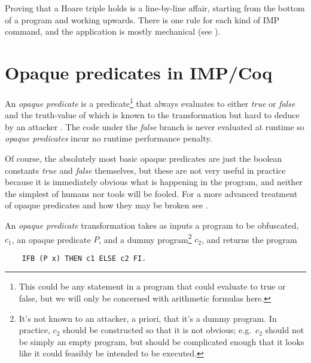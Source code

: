 \documentclass[compsoc,conference,a4paper,10pt,times]{IEEEtran}
\begin{document}
Proving that a Hoare triple holds is a line-by-line affair, starting from the bottom of a program and working upwards.  There is one rule for each kind of IMP command, and the application is mostly mechanical (see \cite{SFV2}).

\section{Opaque predicates in IMP/Coq}
	An \emph{opaque predicate} \cite{CoNa} is a predicate\footnote{This could be any statement in a program that could evaluate to true or false, but we will only be concerned with arithmetic formulas here.} that always evaluates to either \emph{true} or \emph{false} and the truth-value of which is known to the transformation but hard to deduce by an attacker \cite{Prada}. The code under the \emph{false} branch is never evaluated at runtime so \emph{opaque predicates} incur no runtime performance penalty.

Of course, the absolutely most basic opaque predicates are just the boolean constants \emph{true} and \emph{false} themselves, but these are not very useful in practice because it is immediately obvious what is happening in the program, and neither the simplest of humans nor tools will be fooled. For a more advanced treatment of opaque predicates and how they may be broken see \cite{Prada}.


An  \emph{opaque predicate} transformation takes as inputs a program to be obfuscated, $c_1$, an opaque predicate $P$, and a dummy program\footnote{It's not known to an attacker, a priori, that it's a dummy program.  In practice, $c_2$ should be constructed so that it is not obvious; e.g.\ $c_2$ should not be simply an empty program, but should be complicated enough that it looks like it could feasibly be intended to be executed.} $c_2$, and returns the program
\begin{verbatim}
    IFB (P x) THEN c1 ELSE c2 FI.
\end{verbatim}
\end{document}
